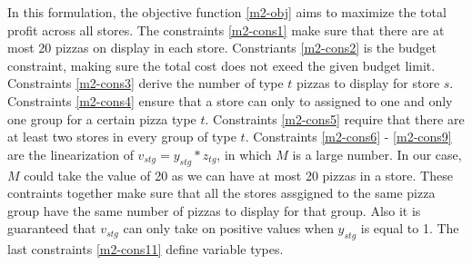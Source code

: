 \documentclass[a4, 11pt]{article}
\begin{document}
In this formulation, the objective function \eqref{m2-obj} aims to maximize the total profit across all stores.
The constraints \eqref{m2-cons1} make sure that there are at most 20 pizzas on display in each store.
Constriants \eqref{m2-cons2} is the budget constraint, making sure the total cost does not exeed the given budget limit.
Constraints \eqref{m2-cons3} derive the number of type $t$ pizzas to display for store $s$.
Constraints \eqref{m2-cons4} ensure that a store can only to assigned to one and only one group for a certain pizza type $t$.
Constraints \eqref{m2-cons5} require that there are at least two stores in every group of type $t$.
Constraints \eqref{m2-cons6} - \eqref{m2-cons9} are the linearization of $v_{stg} = y_{stg} * z_{tg}$, in which $M$ is a large number.
In our case, $M$ could take the value of 20 as we can have at most 20 pizzas in a store.
These contraints together make sure that all the stores assgigned to the same pizza group have the same number of pizzas to display for that group. Also it is guaranteed that $v_{stg}$ can only take on positive values when $y_{stg}$ is equal to 1.
The last constraints \eqref{m2-cons11} define variable types.
	
\end{document}
